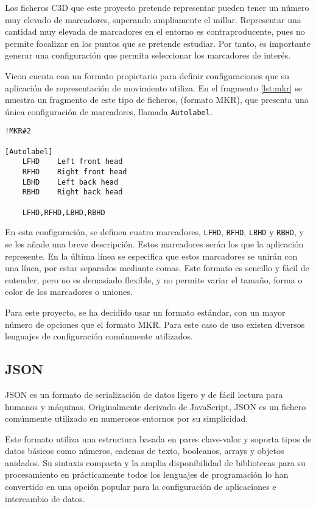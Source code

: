 Los ficheros \ac{C3D} que este proyecto pretende representar pueden tener un número muy elevado de marcadores, superando ampliamente el millar. Representar una cantidad muy elevada de marcadores en el entorno es contraproducente, pues no permite focalizar en los puntos que se pretende estudiar. Por tanto, es importante generar una configuración que permita seleccionar los marcadores de interés.

Vicon cuenta con un formato propietario para definir configuraciones que su aplicación de representación de movimiento utiliza. En el fragmento \autoref{lst:mkr} se muestra un fragmento de este tipo de ficheros, (formato MKR), que presenta una única configuración de marcadores, llamada \texttt{Autolabel}.

\begin{lstlisting}[style=mystyle, caption={Fragmento de un fichero MKR}, label=lst:mkr]
!MKR#2

[Autolabel]
	LFHD	Left front head
	RFHD	Right front head
	LBHD	Left back head
	RBHD	Right back head

    LFHD,RFHD,LBHD,RBHD
\end{lstlisting}

En esta configuración, se definen cuatro marcadores, \texttt{LFHD}, \texttt{RFHD}, \texttt{LBHD} y \texttt{RBHD}, y se les añade una breve descripción. Estos marcadores serán los que la aplicación represente. En la última línea se especifica que estos marcadores se unirán con una línea, por estar separados mediante comas. Este formato es sencillo y fácil de entender, pero no es demasiado flexible, y no permite variar el tamaño, forma o color de los marcadores o uniones.

Para este proyecto, se ha decidido usar un formato estándar, con un mayor número de opciones que el formato MKR. Para este caso de uso existen diversos lenguajes de configuración comúnmente utilizados.

\subsection{\acs{JSON}}

\ac{JSON} es un formato de serialización de datos ligero y de fácil lectura para humanos y máquinas. Originalmente derivado de JavaScript, \ac{JSON} es un fichero comúnmente utilizado en numerosos entornos por su simplicidad.

Este formato utiliza una estructura basada en pares clave-valor y soporta tipos de datos básicos como números, cadenas de texto, booleanos, arrays y objetos anidados. Su sintaxis compacta y la amplia disponibilidad de bibliotecas para su procesamiento en prácticamente todos los lenguajes de programación lo han convertido en una opción popular para la configuración de aplicaciones e intercambio de datos.

